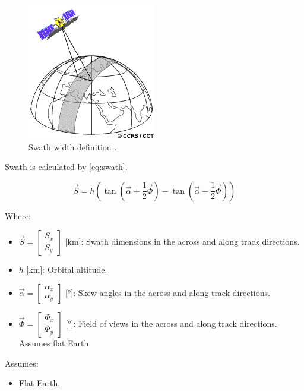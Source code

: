 \documentclass{article}
\begin{document}
\begin{figure}[H]
\centering
\includegraphics[width=0.5\textwidth]{figures/swath.png}
\caption{Swath width definition \cite{Natural_Resources_Canada2008-bt}.}
\label{fig:swath}
\end{figure}

Swath is calculated by \eqref{eq:swath}.

\begin{equation} \label{eq:swath}
    \vec{S} = h \left(\tan{\left(\vec{\alpha} + \frac{1}{2} \vec{\Phi} \right)} - \tan{\left(\vec{\alpha} - \frac{1}{2} \vec{\Phi} \right)} \right)
\end{equation}

Where:
\begin{itemize}[label={}]
    \item $\vec{S} = \begin{bmatrix} S_x \\ S_y \end{bmatrix}$ [\si{\km}]: Swath dimensions in the across and along track directions.
    \item $h$ [\si{\km}]: Orbital altitude.
    \item $\vec{\alpha} = \begin{bmatrix} \alpha_x \\ \alpha_y \end{bmatrix}$ [\si{\degree}]: Skew angles in the across and along track directions.
    \item $\vec{\Phi} = \begin{bmatrix} \Phi_x \\ \Phi_y \end{bmatrix}$ [\si{\degree}]: Field of views in the across and along track directions. Assumes flat Earth.
\end{itemize}

Assumes:
\begin{itemize}
    \item Flat Earth. 
\end{itemize}
\end{document}
